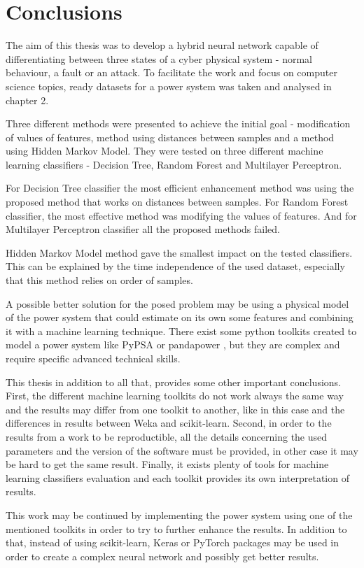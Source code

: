 \chapter*{Conclusions}

The aim of this thesis was to develop a hybrid neural network capable of differentiating between three states of a cyber physical system - normal behaviour, a fault or an attack. To facilitate the work and focus on computer science topics, ready datasets for a power system was taken and analysed in chapter 2. 

Three different methods were presented to achieve the initial goal - modification of values of features, method using distances between samples and a method using Hidden Markov Model. They were tested on three different machine learning classifiers - Decision Tree, Random Forest and Multilayer Perceptron. 

For Decision Tree classifier the most efficient enhancement method was using the proposed method that works on distances between samples. For Random Forest classifier, the most effective method was modifying the values of features. And for Multilayer Perceptron classifier all the proposed methods failed.

Hidden Markov Model method gave the smallest impact on the tested classifiers. This can be explained by the time independence of the used dataset, especially that this method relies on order of samples.

A possible better solution for the posed problem may be using a physical model of the power system that could estimate on its own some features and combining it with a machine learning technique. There exist some python toolkits created to model a power system like PyPSA \cite{brown_pypsapypsa_2020} or pandapower \cite{noauthor_pandapower_nodate}, but they are complex and require specific advanced technical skills.

This thesis in addition to all that, provides some other important conclusions. First, the different machine learning toolkits do not work always the same way and the results may differ from one toolkit to another, like in this case and the differences in results between Weka and scikit-learn. Second, in order to the results from a work to be reproductible, all the details concerning the used parameters and the version of the software must be provided, in other case it may be hard to get the same result. Finally, it exists plenty of tools for machine learning classifiers evaluation and each toolkit provides its own interpretation of results.

This work may be continued by implementing the power system using one of the mentioned toolkits in order to try to further enhance the results. In addition to that, instead of using scikit-learn, Keras \cite{noauthor_keras_nodate} or PyTorch \cite{noauthor_pytorch_nodate} packages may be used in order to create a complex neural network and possibly get better results.   